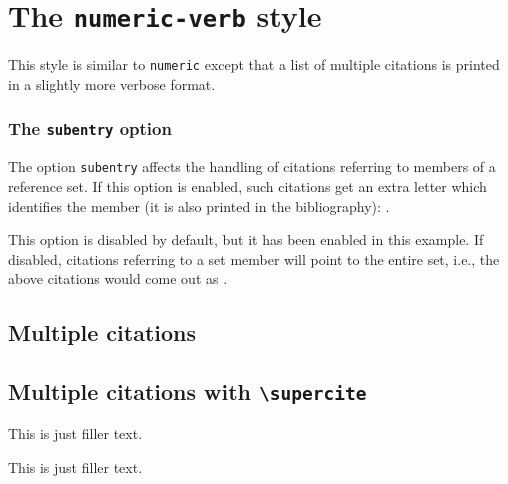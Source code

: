 \documentclass[a4paper]{article}
\newcommand{\cmd}[1]{\texttt{\textbackslash #1}}
\begin{document}
\section*{The \texttt{numeric-verb} style}

This style is similar to \texttt{numeric} except that a list of
multiple citations is printed in a slightly more verbose format.

\subsubsection*{The \texttt{subentry} option}

The option \texttt{subentry} affects the handling of citations
referring to members of a reference set. If this option is enabled,
such citations get an extra letter which identifies the member
(it is also printed in the bibliography):
\cite{glashow,yoon,salam,aksin,companion}.

This option is disabled by default, but it has been enabled
in this example. If disabled, citations referring to a set member
will point to the entire set, i.e., the above citations would
come out as
\cite{stdmodel,set,stdmodel,set,companion}.

\subsection*{Multiple citations}

\cite{hammond,massa,augustine,cotton,set,murray,bertram,stdmodel}

\cite{yoon,salam}

\subsection*{Multiple citations with \cmd{supercite}}

This is just filler text.\supercite{hammond,massa,augustine,cotton,set,murray,bertram,stdmodel}

This is just filler text.\supercite{yoon,salam}

\clearpage
\printbibliography
\end{document}
